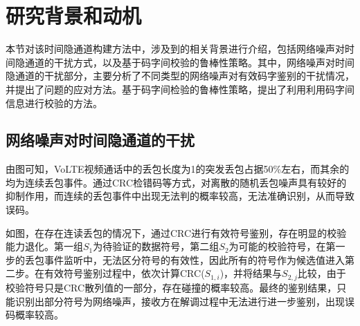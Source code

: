 \section{研究背景和动机}
\label{chap:hash:motivation}

本节对该时间隐通道构建方法中，涉及到的相关背景进行介绍，包括网络噪声对时间隐通道的干扰方式，以及基于码字间校验的鲁棒性策略。其中，网络噪声对时间隐通道的干扰部分，主要分析了不同类型的网络噪声对有效码字鉴别的干扰情况，并提出了问题的应对方法。基于码字间检验的鲁棒性策略，提出了利用利用码字间信息进行校验的方法。

\subsection{网络噪声对时间隐通道的干扰}
\label{chap:hash:motivation:noise}

由图可知，VoLTE视频通话中的丢包长度为1的突发丢包占据50\%左右，而其余的均为连续丢包事件。通过CRC检错码等方式，对离散的随机丢包噪声具有较好的抑制作用，而连续的丢包事件中出现无法判的概率较高，无法准确识别，从而导致误码。


如图，在存在连读丢包的情况下，通过CRC进行有效符号鉴别，存在明显的校验能力退化。第一组$S_{1}$为待验证的数据符号，第二组$S_{2}$为可能的校验符号，在第一步的丢包事件监听中，无法区分符号的有效性，因此所有的符号作为候选值进入第二步。在有效符号鉴别过程中，依次计算CRC($S_{1,i}$)，并将结果与$S_{2,j}$比较，由于校验符号只是CRC散列值的一部分，存在碰撞的概率较高。最终的鉴别结果，只能识别出部分符号为网络噪声，接收方在解调过程中无法进行进一步鉴别，出现误码概率较高。

